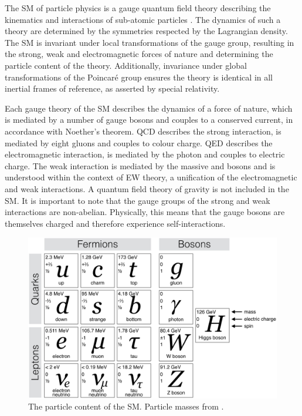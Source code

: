 
The \ac{SM} of particle physics is a gauge quantum field theory describing the kinematics and interactions of sub-atomic particles \cite{Aitchison,Peskin}. The dynamics of such a 
theory are determined by the symmetries respected by the Lagrangian density.
The \ac{SM} is invariant under local transformations of the \SMgroup gauge group,
resulting in the strong, weak and electromagnetic forces of nature and determining
the particle content of the theory. Additionally, invariance under global 
transformations of the Poincaré group ensures the theory is identical in all 
inertial frames of reference, as asserted by special relativity.

Each gauge theory of the \ac{SM} describes the dynamics of a force of nature, which 
is mediated by a number of gauge bosons and couples to a conserved current, in 
accordance with Noether's theorem. \ac{QCD} describes the strong 
interaction, is mediated by eight gluons and couples to colour charge. \ac{QED}
describes the electromagnetic interaction, is mediated by the 
photon and couples to electric charge. The weak interaction is mediated by the massive 
\PWpm and \PZ bosons and is understood within the context of \ac{EW} theory,
a unification of the electromagnetic and weak interactions. A quantum field theory of
gravity is not included in the \ac{SM}. It is important to note that the gauge groups of 
the strong and weak interactions are non-abelian. Physically, this means that the
gauge bosons are themselves charged and therefore experience self-interactions.

\begin{figure}
	\includegraphics[width=\largefigwidth]{tex/motivation/sm_particles}
	\caption{The particle content of the \ac{SM}. Particle masses from \cite{PDG}.}
	\label{fig:sm_particles}
\end{figure}

